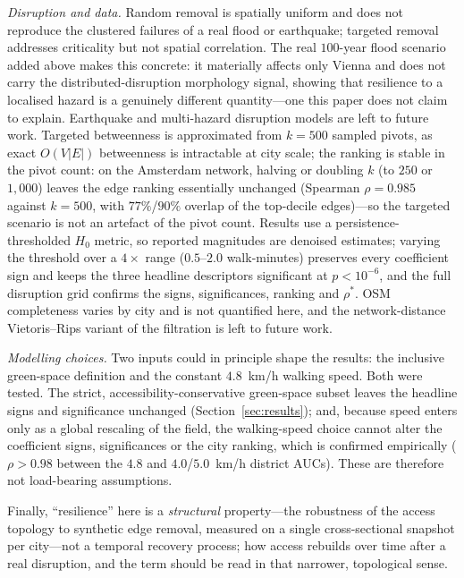 \documentclass[sn-mathphys-num,pdflatex]{sn-jnl}
\newcommand{\rhostar}{\rho^{*}}
\begin{document}
\emph{Disruption and data.} Random removal is spatially uniform and does not
reproduce the clustered failures of a real flood or earthquake; targeted removal
addresses criticality but not spatial correlation. The real $100$-year flood
scenario added above makes this concrete: it materially affects only Vienna and
does not carry the distributed-disruption morphology signal, showing that resilience
to a localised hazard is a genuinely different quantity---one this paper does not
claim to explain. Earthquake and multi-hazard disruption models are left to future
work.
Targeted betweenness is approximated from $k{=}500$ sampled pivots, as exact
$O(V\lvert E\rvert)$ betweenness is intractable at city scale; the ranking is
stable in the pivot count: on the Amsterdam network, halving or
doubling $k$ (to $250$ or $1{,}000$) leaves the edge ranking essentially unchanged
(Spearman $\rho=0.985$ against $k{=}500$, with $77\%$/$90\%$ overlap of the
top-decile edges)---so the targeted scenario is not an artefact of the pivot
count. Results use a persistence-thresholded $H_0$ metric, so reported magnitudes
are denoised estimates; varying the threshold over a $4\times$ range ($0.5$--$2.0$
walk-minutes) preserves every coefficient sign and keeps the three headline
descriptors significant at $p<10^{-6}$, and the full disruption grid confirms the
signs, significances, ranking and $\rhostar$. OSM completeness varies by city and
is not quantified here, and the network-distance Vietoris--Rips variant of the
filtration is left to future work.

\emph{Modelling choices.} Two inputs could in principle shape the results: the
inclusive green-space definition and the constant $4.8$~km/h walking speed. Both were tested. The strict, accessibility-conservative green-space subset leaves the headline
signs and significance unchanged (Section~\ref{sec:results}); and, because speed
enters only as a global rescaling of the field, the walking-speed choice cannot alter
the coefficient signs, significances or the city ranking, which is confirmed
empirically ($\rho>0.98$ between the $4.8$ and $4.0$/$5.0$~km/h district AUCs). These
are therefore not load-bearing assumptions.

Finally, ``resilience'' here is a \emph{structural} property---the robustness of the
access topology to synthetic edge removal, measured on a single cross-sectional
snapshot per city---not a temporal recovery process; how access
rebuilds over time after a real disruption, and the term should be read in that
narrower, topological sense.
\end{document}
